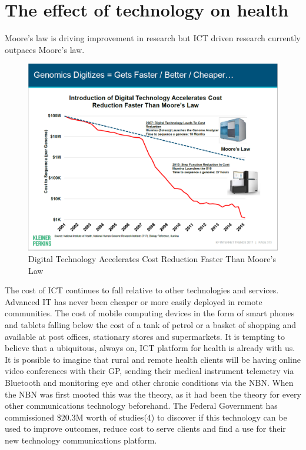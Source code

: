 \section{The effect of technology on health}
Moore's law is driving improvement in research but ICT driven research currently outpaces Moore's law.
\begin{figure}
\centering
\includegraphics[scale=0.5]{figures/MaryMeeker2017-313GenomicsAndMooresLaw.png}
\caption{Digital Technology Accelerates Cost Reduction Faster Than Moore's Law\cite{RefWorks:249}}
\end{figure}
The cost of ICT continues to fall relative to other technologies and services.\cite{RefWorks:323} Advanced IT has never been cheaper or more easily deployed in remote communities. The cost of mobile computing devices in the form of smart phones and tablets falling below the cost of a tank of petrol or a basket of shopping and  available at post offices, stationary stores and supermarkets. It is tempting to believe that a ubiquitous, always on, ICT platform for health is already with us. It is possible to imagine that rural and remote health clients will be having online video conferences with their GP, sending their medical instrument telemetry via Bluetooth and monitoring eye and other chronic conditions via the NBN. When the NBN was first mooted this was the theory, as it had been the theory for every other communications technology beforehand. The Federal Government has commissioned \$20.3M worth of studies(4) to discover if this technology can be used to improve outcomes, reduce cost to serve clients and find a use for their new technology communications platform.

